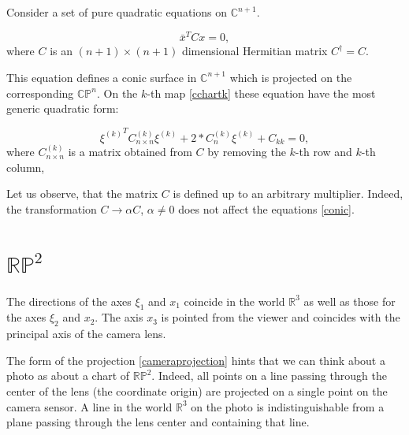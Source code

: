 \documentclass[a4paper,10pt]{article}
\newcommand{\diag}{\mathop{\mathrm{diag}}}
\begin{document}
Consider a set of pure quadratic equations on $\mathbb{C}^{n+1}$.

\begin{equation}
 \bar x^T C x = 0,\label{conic}
\end{equation}
where  $C$ is an $(n+1) \times (n+1)$ dimensional Hermitian matrix $C^\dag  = C$. 

This equation defines a conic surface in $\mathbb{C}^{n+1}$ which is projected on the corresponding $\mathbb{CP}^n$. On the $k$-th map \eqref{cchartk} these equation have the most generic quadratic form:

\begin{equation}
{\xi^{(k)}}^TC^{(k)}_{n\times n}\xi^{(k)} + 2* C^{(k)}_{n}\xi^{(k)} + C_{kk} = 0,
\end{equation}
where $C^{(k)}_{n\times n}$ is a matrix obtained from $C$ by removing the $k$-th row and $k$-th column, 


Let us observe, that the matrix $C$ is defined up to an arbitrary multiplier. Indeed, the transformation $C\to \alpha C$, $\alpha\neq 0$ does not affect the equations \eqref{conic}.

 

 





\section{$\mathbb{RP}^2$}


The directions of the axes $\xi_1$ and $x_1$ coincide in the world $\mathbb{R}^3$ as well as those for the axes  $\xi_2$ and $x_2$. The axis $x_3$ is pointed from the viewer and coincides with the principal axis of the camera lens. 

The form of the projection \eqref{cameraprojection} hints that we can think about a photo as about a chart of $\mathbb{RP}^2$. Indeed, all points on a line passing through the center of the lens (the coordinate origin) are projected on a single point on the camera sensor. A line in the world $\mathbb{R}^3$ on the photo is indistinguishable from a plane passing through the lens center and containing that line.  
\end{document}

